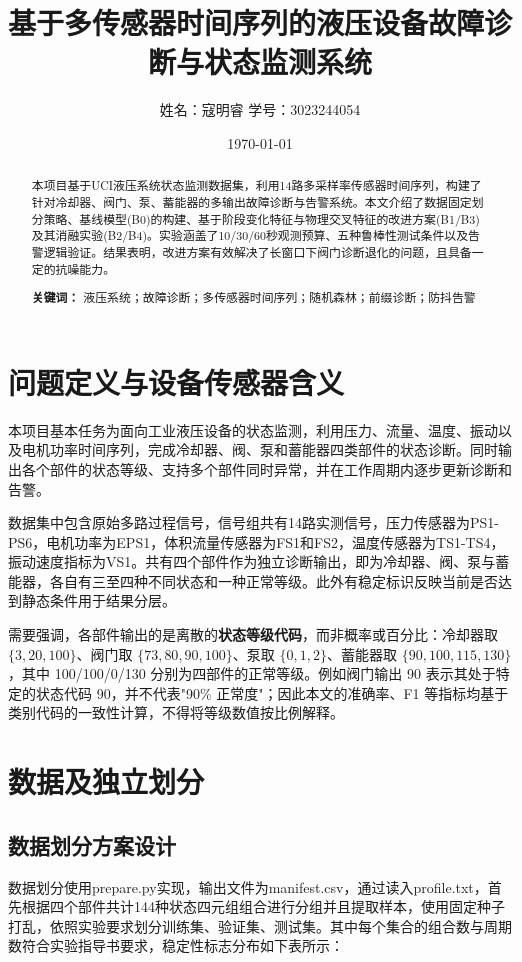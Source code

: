 \documentclass[12pt, a4paper]{ctexart}
\title{基于多传感器时间序列的液压设备故障诊断与状态监测系统}
\author{姓名：寇明睿 \quad 学号：3023244054 }
\date{\today}
\begin{document}
\maketitle

\begin{abstract}
本项目基于UCI液压系统状态监测数据集\cite{helwig2015}，利用14路多采样率传感器时间序列，构建了针对冷却器、阀门、泵、蓄能器的多输出故障诊断与告警系统。本文介绍了数据固定划分策略、基线模型(B0)的构建、基于阶段变化特征与物理交叉特征的改进方案(B1/B3)及其消融实验(B2/B4)。实验涵盖了10/30/60秒观测预算、五种鲁棒性测试条件以及告警逻辑验证。结果表明，改进方案有效解决了长窗口下阀门诊断退化的问题，且具备一定的抗噪能力。
\par\vspace{0.8em}\noindent\textbf{关键词：} 液压系统；故障诊断；多传感器时间序列；随机森林；前缀诊断；防抖告警
\end{abstract}

\section{问题定义与设备传感器含义}
本项目基本任务为面向工业液压设备的状态监测，利用压力、流量、温度、振动以及电机功率时间序列，完成冷却器、阀、泵和蓄能器四类部件的状态诊断。同时输出各个部件的状态等级、支持多个部件同时异常，并在工作周期内逐步更新诊断和告警。

数据集中包含原始多路过程信号，信号组共有14路实测信号，压力传感器为PS1-PS6，电机功率为EPS1，体积流量传感器为FS1和FS2，温度传感器为TS1-TS4，振动速度指标为VS1。共有四个部件作为独立诊断输出，即为冷却器、阀、泵与蓄能器，各自有三至四种不同状态和一种正常等级。此外有稳定标识反映当前是否达到静态条件用于结果分层。

需要强调，各部件输出的是离散的\textbf{状态等级代码}，而非概率或百分比：冷却器取 $\{3, 20, 100\}$、阀门取 $\{73, 80, 90, 100\}$、泵取 $\{0, 1, 2\}$、蓄能器取 $\{90, 100, 115, 130\}$，其中 100/100/0/130 分别为四部件的正常等级。例如阀门输出 90 表示其处于特定的状态代码 90，并不代表"90\% 正常度"；因此本文的准确率、F1 等指标均基于类别代码的一致性计算，不得将等级数值按比例解释。

\section{数据及独立划分}

\subsection{数据划分方案设计}
数据划分使用prepare.py实现，输出文件为manifest.csv，通过读入profile.txt，首先根据四个部件共计144种状态四元组组合进行分组并且提取样本，使用固定种子打乱，依照实验要求划分训练集、验证集、测试集。其中每个集合的组合数与周期数符合实验指导书要求，稳定性标志分布如下表所示：
\end{document}
